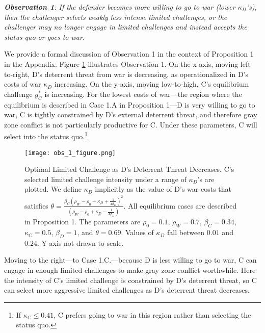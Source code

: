 \documentclass[
]{article}
\begin{document}
\textbf{\textit{Observation 1}}\textit{: If the defender becomes more willing to go to war (lower $\kappa_{D}$'s), then the challenger selects weakly less intense limited challenges, or the challenger may no longer engage in limited challenges and instead accepts the status quo or goes to war.}

We provide a formal discussion of Observation 1 in the context of Proposition 1 in the Appendix. Figure \ref{fig:optimaldetdecrease} illustrates Observation 1. On the x-axis, moving left-to-right, D's deterrent threat from war is decreasing, as operationalized in D's costs of war \(\kappa_{D}\) increasing. On the y-axis, moving low-to-high, C's equilibrium challenge \(g_{C}^{*}\) is increasing. For the lowest costs of war---the region where the equilibrium is described in Case 1.A in Proposition 1---D is very willing to go to war, C is tightly constrained by D's external deterrent threat, and therefore gray zone conflict is not particularly productive for C. Under these parameters, C will select into the status quo.\footnote{If \(\kappa_{C} \leq 0.41\), C prefers going to war in this region rather than selecting the status quo.}

\begin{figure}[h]
    \centering
        \texttt{[image: obs\_1\_figure.png]}
        \caption{Optimal Limited Challenge as D's Deterrent Threat Decreases. C's selected limited challenge intensity under a range of $\kappa_D$'s are plotted. We define $\underline{\kappa_{D}}$ implicitly as the value of D's war costs that satisfies $\theta=\frac{\beta_{C}\left(\rho_{W}-\rho_{0}+\underline{\kappa_{D}}+\frac{1}{4\beta_{D}}\right)^{2}}{\left(\rho_{W}-\rho_{0}+\underline{\kappa_{D}}-\frac{1}{4\beta_{D}}\right)}$. All equilibrium cases are described in Proposition 1. 
        The parameters are $\rho_0=0.1$, $\rho_W=0.7$, $\beta_C=0.34$, $\kappa_{C}=0.5$, $\beta_D=1$, and $\theta=0.69$. Values of $\kappa_D$ fall between $0.01$ and $0.24$. Y-axis not drawn to scale.}
    \label{fig:optimaldetdecrease}
    \end{figure}

Moving to the right---to Case 1.C.---because D is less willing to go to war, C can engage in enough limited challenges to make gray zone conflict worthwhile. Here the intensity of C's limited challenge is constrained by D's deterrent threat, so C can select more aggressive limited challenges as D's deterrent threat decreases.
\end{document}
